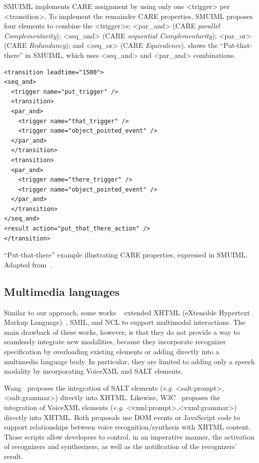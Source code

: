 SMUIML implements CARE assignment by using only one <trigger> per <transition>.
To implement the remainder CARE properties, SMUIML proposes four elements to
combine the <trigger>s: <par\_and> (CARE \textit{parallel Complementarity});
<seq\_and> (CARE \textit{sequential Complementarity}); <par\_or> (CARE
\textit{Redundancy}); and <seq\_or> (CARE \textit{Equivalence}).
 shows the “Put-that-there” in SMUIML, which uses <seq\_and>
and <par\_and> combinations.

\begin{listing}
\begin{verbatim}
<transition leadtime="1500">
<seq_and>
  <trigger name="put_trigger" />
  <transition>
  <par_and>
    <trigger name="that_trigger" />
    <trigger name="object_pointed_event" />
  </par_and>
  </transition>
  <transition>
  <par_and>
    <trigger name="there_trigger" />
    <trigger name="object_pointed_event" />
  </par_and>
  </transition>
</seq_and>
<result action="put_that_there_action" />
</transition>
\end{verbatim}
\caption[“Put-that-there” expressed in SMUIML.]{“Put-that-there” example
illustrating CARE properties, expressed in
SMUIML. Adapted from~\cite{dumas_frameworks_2010}.}
\label{list:smuiml}
\end{listing}

\subsection{Multimedia languages}
\label{sec:state:multimedia}

Similar to our approach, some works
~\cite{beckham_towards_2001,carvalho_architectures_2008,
carvalho_estendendo_2010,	w3c_xhtml+voice_2001,wang_salt:_2002} extended XHTML
(eXtensible Hypertext Markup Language)~\cite{w3c_xhtml_2000}, SMIL, and NCL to
support multimodal interactions. The main drawback of these works, however, is
that they do not provide a way to seamlessly integrate new modalities, because
they incorporate recognizer specification by overloading existing elements or
adding directly into a multimedia language body. In particular, they are limited
to adding only a speech modality by incorporating VoiceXML and SALT elements.

Wang~\cite{wang_salt:_2002} proposes the integration of SALT elements
(\textit{e.g.} <salt:prompt>, <salt:grammar>) directly into XHTML. Likewise,
W3C~\cite{w3c_xhtml+voice_2001} proposes the integration of VoiceXML elements
(\textit{e.g.} <vxml:prompt>,<vxml:grammar>) directly into XHTML. Both proposals
use DOM events or JavaScript code to support relationships between voice
recognition/synthesis with XHTML content. Those scripts allow developers to
control, in an imperative manner, the activation of recognizers and
synthesizers, as well as the notification of the recognizers’ result.

